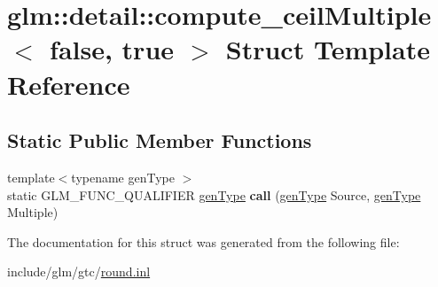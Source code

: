 \hypertarget{structglm_1_1detail_1_1compute__ceilMultiple_3_01false_00_01true_01_4}{}\section{glm\+:\+:detail\+:\+:compute\+\_\+ceil\+Multiple$<$ false, true $>$ Struct Template Reference}
\label{structglm_1_1detail_1_1compute__ceilMultiple_3_01false_00_01true_01_4}
\subsection*{Static Public Member Functions}
\begin{DoxyCompactItemize}
\item 
\mbox{\label{structglm_1_1detail_1_1compute__ceilMultiple_3_01false_00_01true_01_4_a065f8762eb2b48c4f746781fac7ab7f7}} 
{\footnotesize template$<$typename gen\+Type $>$ }\\static G\+L\+M\+\_\+\+F\+U\+N\+C\+\_\+\+Q\+U\+A\+L\+I\+F\+I\+ER \hyperlink{structglm_1_1detail_1_1genType}{gen\+Type} {\bfseries call} (\hyperlink{structglm_1_1detail_1_1genType}{gen\+Type} Source, \hyperlink{structglm_1_1detail_1_1genType}{gen\+Type} Multiple)
\end{DoxyCompactItemize}


The documentation for this struct was generated from the following file\+:\begin{DoxyCompactItemize}
\item 
include/glm/gtc/\hyperlink{round_8inl}{round.\+inl}\end{DoxyCompactItemize}

